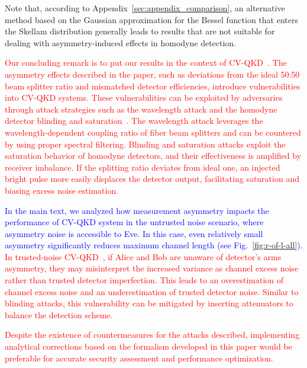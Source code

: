 \documentclass[%
reprint,
superscriptaddress,
 amsmath,amssymb,amsfonts,
 aps,
 pra,
 longbibliography
]{revtex4-2}
\begin{document}
Note that, according to Appendix~\ref{sec:appendix_comparison},
an alternative method based on the Gaussian approximation
for the Bessel function that enters the Skellam distribution
generally leads to  results that are not suitable for dealing with
asymmetry-induced effects in homodyne detection.

\textcolor{red}{Our concluding remark is to put our results in the context of CV-QKD{~\cite{zhang2024continuous}}. 
The asymmetry effects described in the paper, such as deviations from the ideal 50:50 beam splitter ratio and mismatched detector efficiencies, introduce vulnerabilities into CV-QKD systems. %
These vulnerabilities can be exploited by adversaries through attack strategies such as the wavelength attack \cite{huang2012wavelength, huang2014quantum} and the homodyne detector blinding \cite{qin2018homodyne} and saturation~\cite{qin2016quantum}. The wavelength attack leverages the wavelength-dependent coupling ratio of fiber beam splitters and can be countered by using proper spectral filtering. Blinding and saturation attacks exploit the saturation behavior of homodyne detectors, and their effectiveness is amplified by receiver imbalance. If the splitting ratio deviates from ideal one, an injected bright pulse more easily displaces the detector output, facilitating saturation and biasing excess noise estimation.} 

\textcolor{blue}{In the main text, we analyzed how measurement asymmetry impacts the performance of CV-QKD system in the untrusted noise scenario, where asymmetry noise is accessible to Eve. In this case, even relatively small asymmetry significantly reduces maximum channel length (see Fig.~\ref{fig:r-of-l-all}).} \textcolor{red}{In trusted-noise CV-QKD~\cite{usenko2016trusted}, if Alice and Bob are unaware of detector’s arms asymmetry, they may misinterpret the increased variance as channel excess noise rather than trusted detector imperfection. This leads to an overestimation of channel excess noise and an underestimation of trusted detector noise. Similar to blinding attacks, this vulnerability can be mitigated by inserting attenuators to balance the detection scheme.}

\textcolor{red}{Despite the existence of countermeasures for the attacks described, implementing analytical corrections based on the formalism developed in this paper would be preferable for accurate security assessment and performance optimization.}
\end{document}
